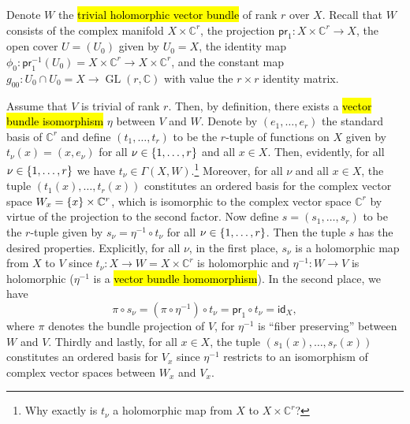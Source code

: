 \documentclass[a4paper]{amsart}
\newcommand{\C}{\mathbb{C}}
\newcommand{\id}[1]{\mathsf{id}_{#1}}
\newcommand{\pr}[1]{\mathsf{pr}_{#1}}
\theoremstyle{remark}
\numberwithin{equation}{question}
\DeclarePairedDelimiter\set{\{}{\}}
\DeclareMathOperator{\GL}{GL}
\begin{document}
\begin{solution}%
Denote $W$ the \hl{trivial holomorphic vector bundle} of rank $r$ over $X$. Recall that $W$ consists of the complex manifold $X \times \C^r$, the projection $\pr1 \colon X \times \C^r \to X$, the open cover $U = (U_0)$ given by $U_0 = X$, the identity map $\phi_0 \colon \pr1^{-1}(U_0) = X \times \C^r \to X \times \C^r$, and the constant map $g_{00} \colon U_0 \cap U_0 = X \to \GL(r,\C)$ with value the $r\times r$ identity matrix.

Assume that $V$ is trivial of rank $r$. Then, by definition, there exists a \hl{vector bundle isomorphism} $\eta$ between $V$ and $W$. Denote by $(e_1,\dots,e_r)$ the standard basis of $\C^r$ and define $(t_1,\dots,t_r)$ to be the $r$-tuple of functions on $X$ given by $t_\nu(x) = (x,e_\nu)$ for all $\nu \in \set{1,\dots,r}$ and all $x \in X$. Then, evidently, for all $\nu \in \set{1,\dots,r}$ we have $t_\nu \in \Gamma(X,W)$.\footnote{Why exactly is $t_\nu$ a holomorphic map from $X$ to $X \times \C^r$?} Moreover, for all $\nu$ and all $x \in X$, the tuple $(t_1(x),\dots,t_r(x))$ constitutes an ordered basis for the complex vector space $W_x = \set x \times \C^r$, which is isomorphic to the complex vector space $\C^r$ by virtue of the projection to the second factor.
Now define $s = (s_1,\dots,s_r)$ to be the $r$-tuple given by $s_\nu = \eta^{-1} \circ t_\nu$ for all $\nu \in \set{1,\dots,r}$. Then the tuple $s$ has the desired properties. Explicitly, for all $\nu$, in the first place, $s_\nu$ is a holomorphic map from $X$ to $V$ since $t_\nu \colon X \to W = X \times \C^r$ is holomorphic and $\eta^{-1} \colon W \to V$ is holomorphic ($\eta^{-1}$ is a \hl{vector bundle homomorphism}). In the second place, we have
\[
\pi \circ s_\nu = (\pi \circ \eta^{-1}) \circ t_\nu = \pr1 \circ t_\nu = \id X,
\]
where $\pi$ denotes the bundle projection of $V$,
for $\eta^{-1}$ is “fiber preserving” between $W$ and $V$. Thirdly and lastly, for all $x \in X$, the tuple $(s_1(x),\dots,s_r(x))$ constitutes an ordered basis for $V_x$ since $\eta^{-1}$ restricts to an isomorphism of complex vector spaces between $W_x$ and $V_x$.


\end{solution}
\end{document}
